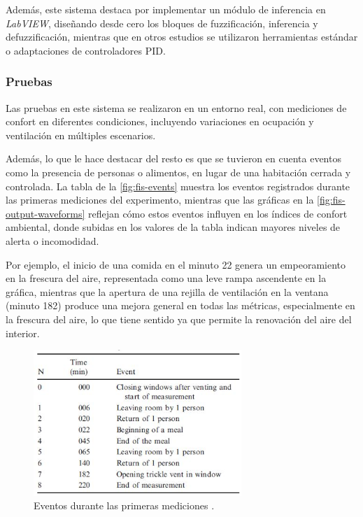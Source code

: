 Además, este sistema destaca por implementar un módulo de inferencia en \textit{LabVIEW}, diseñando desde cero los bloques de fuzzificación, inferencia y defuzzificación, mientras que en otros estudios se utilizaron herramientas estándar o adaptaciones de controladores PID.

\subsubsection{Pruebas}

Las pruebas en este sistema se realizaron en un entorno real, con mediciones de confort en diferentes condiciones, incluyendo variaciones en ocupación y ventilación en múltiples escenarios.

Además, lo que le hace destacar del resto es que se tuvieron en cuenta eventos como la presencia de personas o alimentos, en lugar de una habitación cerrada y controlada. La tabla de la \autoref{fig:fis-events} muestra los eventos registrados durante las primeras mediciones del experimento, mientras que las gráficas en la \autoref{fig:fis-output-waveforms} reflejan cómo estos eventos influyen en los índices de confort ambiental, donde subidas en los valores de la tabla indican mayores niveles de alerta o incomodidad.

Por ejemplo, el inicio de una comida en el minuto 22 genera un empeoramiento en la frescura del aire, representada como una leve rampa ascendente en la gráfica, mientras que la apertura de una rejilla de ventilación en la ventana (minuto 182) produce una mejora general en todas las métricas, especialmente en la frescura del aire, lo que tiene sentido ya que permite la renovación del aire del interior.

\begin{figure}[H]
	\centering
	\includegraphics[width=0.7\textwidth]{imgs/fis-events.JPG}
	\caption{Eventos durante las primeras mediciones \parencite{jablonski2018fuzzy}.}
	\label{fig:fis-events}
\end{figure}

